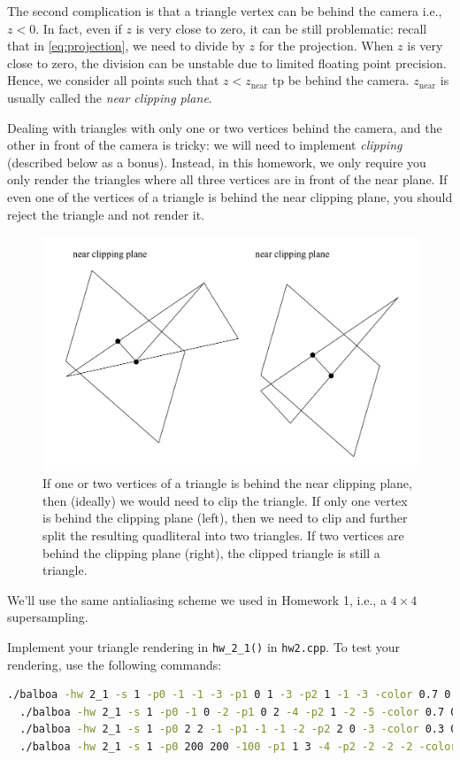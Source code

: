 The second complication is that a triangle vertex can be behind the camera i.e., $z < 0$. In fact, even if $z$ is very close to zero, it can be still problematic: recall that in \cref{eq:projection}, we need to divide by $z$ for the projection. When $z$ is very close to zero, the division can be unstable due to limited floating point precision. Hence, we consider all points such that $z < z_{\text{near}}$ tp be behind the camera. $z_{\text{near}}$ is usually called the \emph{near clipping plane}.

Dealing with triangles with only one or two vertices behind the camera, and the other in front of the camera is tricky: we will need to implement \emph{clipping} (described below as a bonus). Instead, in this homework, we only require you only render the triangles where all three vertices are in front of the near plane. If even one of the vertices of a triangle is behind the near clipping plane, you should reject the triangle and not render it.

\begin{figure}[h]
    \centering
    \includegraphics[width=0.7\linewidth]{imgs/triangle_clipping.pdf}
    \caption{If one or two vertices of a triangle is behind the near clipping plane, then (ideally) we would need to clip the triangle. If only one vertex is behind the clipping plane (left), then we need to clip and further split the resulting quadliteral into two triangles. If two vertices are behind the clipping plane (right), the clipped triangle is still a triangle.}
    \label{fig:triangle_clipping}
\end{figure}

We'll use the same antialiasing scheme we used in Homework 1, i.e., a $4\times4$ supersampling.

Implement your triangle rendering in \lstinline{hw_2_1()} in \lstinline{hw2.cpp}. To test your rendering, use the following commands:
\begin{lstlisting}[language=bash]
  ./balboa -hw 2_1 -s 1 -p0 -1 -1 -3 -p1 0 1 -3 -p2 1 -1 -3 -color 0.7 0.3 0.4 -znear 1e-6
  ./balboa -hw 2_1 -s 1 -p0 -1 0 -2 -p1 0 2 -4 -p2 1 -2 -5 -color 0.7 0.3 0.8 -znear 1e-6
  ./balboa -hw 2_1 -s 1 -p0 2 2 -1 -p1 -1 -1 -2 -p2 2 0 -3 -color 0.3 0.8 0.2 -znear 1e-6
  ./balboa -hw 2_1 -s 1 -p0 200 200 -100 -p1 1 3 -4 -p2 -2 -2 -2 -color 0.8 0.1 0.3 -znear 1e-6
\end{lstlisting}

